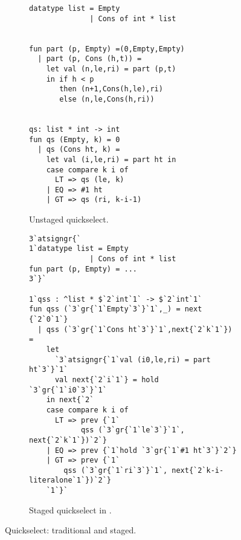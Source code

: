 
\begin{figure}[t]
\begin{subfigure}{0.5\textwidth}
\begin{lstlisting} 
datatype list = Empty 
              | Cons of int * list


fun part (p, Empty) =(0,Empty,Empty) 
  | part (p, Cons (h,t)) = 
    let val (n,le,ri) = part (p,t) 
    in if h < p 
       then (n+1,Cons(h,le),ri) 
       else (n,le,Cons(h,ri))


qs: list * int -> int
fun qs (Empty, k) = 0
  | qs (Cons ht, k) =
    let val (i,le,ri) = part ht in 
    case compare k i of
      LT => qs (le, k)
    | EQ => #1 ht
    | GT => qs (ri, k-i-1)

\end{lstlisting}
\caption{Unstaged quickselect.}
\label{fig:qs-unstaged}
\end{subfigure}
\hfill
\begin{subfigure}{0.5\textwidth}
\begin{lstlisting} 
3`atsigngr{`  
1`datatype list = Empty 
              | Cons of int * list
fun part (p, Empty) = ... 
3`}`

1`qss : ^list * $`2`int`1` -> $`2`int`1`
fun qss (`3`gr{`1`Empty`3`}`1`,_) = next {`2`0`1`}
  | qss (`3`gr{`1`Cons ht`3`}`1`,next{`2`k`1`}) = 
    let 
      `3`atsigngr{`1`val (i0,le,ri) = part ht`3`}`1`
      val next{`2`i`1`} = hold `3`gr{`1`i0`3`}`1`
    in next{`2` 
    case compare k i of
      LT => prev {`1`
            qss (`3`gr{`1`le`3`}`1`, next{`2`k`1`})`2`}
    | EQ => prev {`1`hold `3`gr{`1`#1 ht`3`}`2`}
    | GT => prev {`1`
        qss (`3`gr{`1`ri`3`}`1`, next{`2`k-i-literalone`1`})`2`}
    `1`}`
\end{lstlisting}
\caption{Staged quickselect in \lang.}

\label{fig:qs-staged}
\end{subfigure}
\caption{Quickselect: traditional and staged.}
\end{figure}

